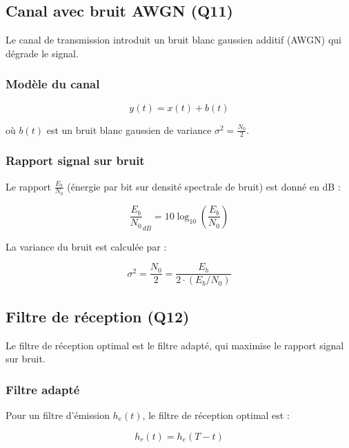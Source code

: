 \documentclass[12pt,a4paper]{article}
\begin{document}
\subsection{Canal avec bruit AWGN (Q11)}

Le canal de transmission introduit un bruit blanc gaussien additif (AWGN) qui dégrade le signal.

\subsubsection{Modèle du canal}

\begin{equation}
    y(t) = x(t) + b(t)
\end{equation}

où $b(t)$ est un bruit blanc gaussien de variance $\sigma^2 = \frac{N_0}{2}$.

\subsubsection{Rapport signal sur bruit}

Le rapport $\frac{E_b}{N_0}$ (énergie par bit sur densité spectrale de bruit) est donné en dB :

\begin{equation}
    \frac{E_b}{N_0}_{dB} = 10 \log_{10}\left(\frac{E_b}{N_0}\right)
\end{equation}

La variance du bruit est calculée par :

\begin{equation}
    \sigma^2 = \frac{N_0}{2} = \frac{E_b}{2 \cdot (E_b/N_0)}
\end{equation}

\subsection{Filtre de réception (Q12)}

Le filtre de réception optimal est le filtre adapté, qui maximise le rapport signal sur bruit.

\subsubsection{Filtre adapté}

Pour un filtre d'émission $h_e(t)$, le filtre de réception optimal est :

\begin{equation}
    h_r(t) = h_e(T - t)
\end{equation}
\end{document}
